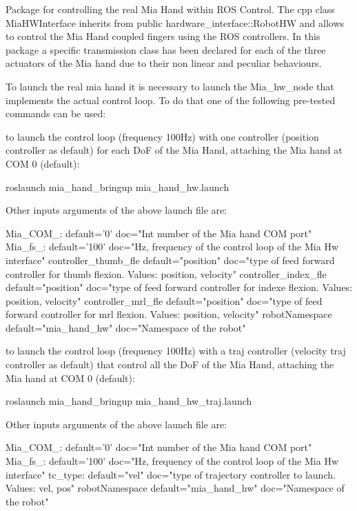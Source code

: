 Package for controlling the real Mia Hand within R\+OS Control. The cpp class Mia\+H\+W\+Interface inherits from public hardware\+\_\+interface\+::\+Robot\+HW and allows to control the Mia Hand coupled fingers using the R\+OS controllers. In this package a specific transmission class has been declared for each of the three actuators of the Mia hand due to their non linear and peculiar behaviours.

To launch the real mia hand it is necessary to launch the Mia\+\_\+hw\+\_\+node that implements the actual control loop. To do that one of the following pre-\/tested commands can be used\+:


\begin{DoxyItemize}
\item to launch the control loop (frequency 100Hz) with one controller (position controller as default) for each DoF of the Mia Hand, attaching the Mia hand at C\+OM 0 (default)\+: \begin{DoxyVerb}roslaunch mia_hand_bringup mia_hand_hw.launch
\end{DoxyVerb}


Other inputs arguments of the above launch file are\+: \begin{DoxyVerb}Mia_COM_:               default='0'            doc="Int number of the Mia hand COM port"
Mia_fs_:                default='100'          doc="Hz, frequency of the control loop of the Mia Hw interface"
controller_thumb_fle    default="position"     doc="type of feed forward controller for thumb flexion. Values: position, velocity"
controller_index_fle    default="position"     doc="type of feed forward controller for indexe flexion. Values: position, velocity"
controller_mrl_fle      default="position"     doc="type of feed forward controller for mrl flexion. Values: position, velocity"
robotNamespace          default="mia_hand_hw"  doc="Namespace of the robot"
\end{DoxyVerb}

\item to launch the control loop (frequency 100Hz) with a traj controller (velocity traj controller as default) that control all the DoF of the Mia Hand, attaching the Mia hand at C\+OM 0 (default)\+: \begin{DoxyVerb}roslaunch mia_hand_bringup mia_hand_hw_traj.launch
\end{DoxyVerb}


Other inputs arguments of the above launch file are\+: \begin{DoxyVerb}Mia_COM_:               default='0'            doc="Int number of the Mia hand COM port"
Mia_fs_:                default='100'          doc="Hz, frequency of the control loop of the Mia Hw interface"
tc_type:                default="vel"          doc="type of trajectory controller to launch. Values: vel, pos"
robotNamespace          default="mia_hand_hw"  doc="Namespace of the robot"
\end{DoxyVerb}


\end{DoxyItemize}
